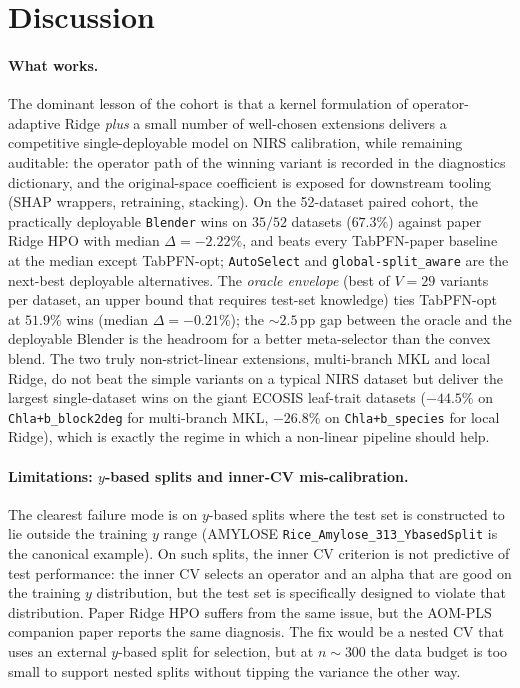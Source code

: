 \documentclass[11pt,a4paper]{article}
\begin{document}
\section{Discussion}\label{sec:discussion}

\paragraph{What works.}
The dominant lesson of the cohort is that a kernel formulation of
operator-adaptive Ridge \emph{plus} a small number of well-chosen
extensions delivers a competitive single-deployable model on NIRS
calibration, while remaining auditable: the operator path of the
winning variant is recorded in the diagnostics dictionary, and the
original-space coefficient is exposed for downstream tooling (SHAP
wrappers, retraining, stacking). On the 52-dataset paired cohort,
the practically deployable \texttt{Blender} wins on $35/52$ datasets
($67.3\%$) against paper Ridge HPO with median $\Delta = -2.22\%$,
and beats every TabPFN-paper baseline at the median except
TabPFN-opt; \texttt{AutoSelect} and \texttt{global-split\_aware}
are the next-best deployable alternatives. The
\emph{oracle envelope} (best of $V=29$ variants per dataset, an
upper bound that requires test-set knowledge) ties TabPFN-opt at
$51.9\%$ wins (median $\Delta=-0.21\%$); the $\sim 2.5$\,pp gap
between the oracle and the deployable Blender is the headroom for a
better meta-selector than the convex blend. The two truly
non-strict-linear extensions, multi-branch MKL and local Ridge, do
not beat the simple variants on a typical NIRS dataset but deliver
the largest single-dataset wins on the giant ECOSIS leaf-trait
datasets ($-44.5\%$ on \texttt{Chla+b\_block2deg} for multi-branch
MKL, $-26.8\%$ on \texttt{Chla+b\_species} for local Ridge), which is
exactly the regime in which a non-linear pipeline should help.

\paragraph{Limitations: $y$-based splits and inner-CV mis-calibration.}
The clearest failure mode is on $y$-based splits where the test set
is constructed to lie outside the training $y$ range
(AMYLOSE \texttt{Rice\_Amylose\_313\_YbasedSplit} is the canonical
example). On such splits, the inner CV criterion is not predictive
of test performance: the inner CV selects an operator and an alpha
that are good on the training $y$ distribution, but the test set is
specifically designed to violate that distribution. Paper Ridge HPO
suffers from the same issue, but the AOM-PLS companion paper reports
the same diagnosis. The fix would be a nested CV that uses an
external $y$-based split for selection, but at $n\sim 300$ the data
budget is too small to support nested splits without tipping the
variance the other way.
\end{document}
